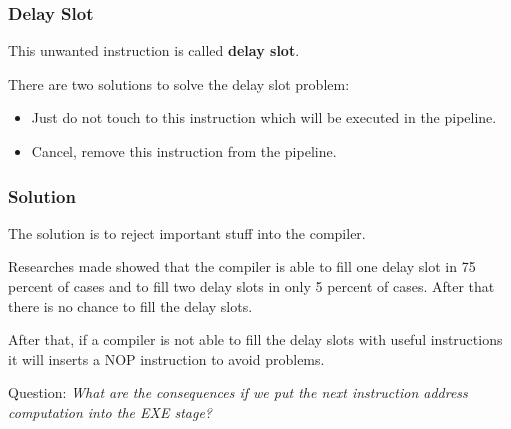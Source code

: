 
\begin{frame}
  \frametitle{Delay Slot}

  This unwanted instruction is called \textbf{delay slot}.

  \-

  There are two solutions to solve the delay slot problem:

  \begin{itemize}
    \item
      Just do not touch to this instruction which will be executed
      in the pipeline.
    \item
      Cancel, remove this instruction from the pipeline.
  \end{itemize}
\end{frame}


\begin{frame}
  \frametitle{Solution}

  The solution is to reject important stuff into the compiler.

  \-

  Researches made showed that the compiler is able to fill one delay
  slot in 75 percent of cases and to fill two delay slots in only
  5 percent of cases. After that there is no chance to fill the delay
  slots.

  \-

  After that, if a compiler is not able to fill the delay slots
  with useful instructions it will inserts a NOP instruction to avoid
  problems.

  \-

  Question: \textit{What are the consequences if we put the next
    instruction address computation into the EXE stage?}
\end{frame}


